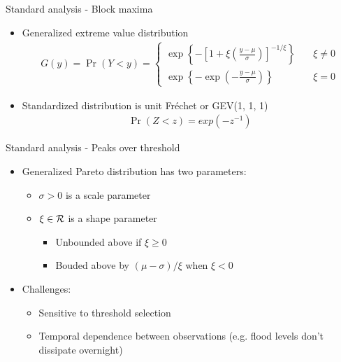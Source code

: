 \documentclass{beamer}
\begin{document}
\begin{frame}{Standard analysis - Block maxima}
  \begin{itemize} \setlength{\itemsep}{0.5em}
    \item Generalized extreme value distribution
    \begin{align*}
      G(y) = \Pr(Y < y) = \left\{  \begin{array}{ll}
        \exp\left\{ -\left[ 1 + \xi \left( \frac{ y - \mu }{ \sigma } \right) \right]^{ -1 / \xi} \right\} & \quad \xi \neq 0 \\[0.5em]
        \exp \left\{ -\exp \left( - \frac{ y - \mu }{ \sigma} \right) \right\} & \quad \xi = 0
      \end{array}\right.
    \end{align*}
    \item Standardized distribution is unit Fr\'{e}chet or GEV(1, 1, 1)
    \begin{align*}
      \Pr(Z < z) = exp(-z^{-1})
    \end{align*}
  \end{itemize}
\end{frame}

\begin{frame}{Standard analysis - Peaks over threshold}
  \begin{itemize} \setlength{\itemsep}{0.5em}
    \item Generalized Pareto distribution has two parameters:
    \begin{itemize}
      \item $\sigma > 0$ is a scale parameter
      \item $\xi \in {\cal R}$ is a shape parameter
      \begin{itemize}
        \item Unbounded above if $\xi \ge 0$
        \item Bouded above by $(\mu - \sigma) / \xi$ when $\xi < 0$
      \end{itemize}
    \end{itemize}
    \item Challenges:
    \begin{itemize}
      \item Sensitive to threshold selection
      \item Temporal dependence between observations (e.g. flood levels don't dissipate overnight)
    \end{itemize}
  \end{itemize}
\end{frame}
\end{document}
